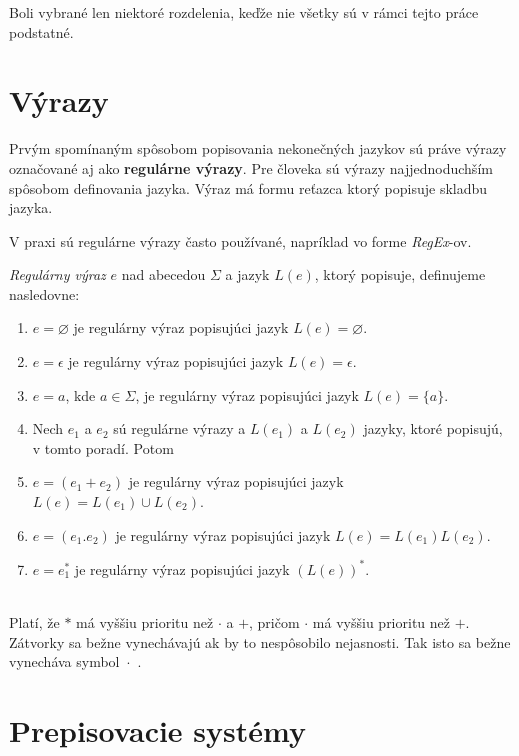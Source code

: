 Boli vybrané len niektoré rozdelenia, keďže nie všetky sú v rámci tejto práce podstatné.

\section{Výrazy}
\label{regularExpression}

Prvým spomínaným spôsobom popisovania nekonečných jazykov sú práve výrazy označované aj ako \textbf{regulárne výrazy}. Pre človeka sú výrazy najjednoduchším spôsobom definovania jazyka. Výraz má formu reťazca ktorý popisuje skladbu jazyka.

V praxi sú regulárne výrazy často používané, napríklad vo forme \textit{RegEx}-ov.

\begin{definition}
\textit{Regulárny výraz} $e$ nad abecedou $\Sigma$ a jazyk $L(e)$, ktorý popisuje, definujeme nasledovne:

\begin{enumerate}
    \itemsep0.2em 
    \item $e = \varnothing$ je regulárny výraz popisujúci jazyk $L(e) = \varnothing$.
    \item $e = \epsilon$ je regulárny výraz popisujúci jazyk $L(e) = \epsilon$.
    \item $e = a$, kde $a \in \Sigma$, je regulárny výraz popisujúci jazyk $L(e) = \{a\}$.
    \item[] Nech $e_1$ a $e_2$ sú regulárne výrazy a $L(e_1)$ a $L(e_2)$ jazyky, ktoré popisujú, v tomto poradí. Potom
    \item $e = (e_1 + e_2)$ je regulárny výraz popisujúci jazyk $L(e) = L(e_1) \cup L(e_2)$.
    \item $e = (e_1 . e_2)$ je regulárny výraz popisujúci jazyk $L(e) = L(e_1)L(e_2)$.
    \item $e = e_{1}^*$ je regulárny výraz popisujúci jazyk $(L(e))^*$.
\end{enumerate}
\end{definition}
\hfill\\

Platí, že $*$ má vyššiu prioritu než $\cdot$ a $+$, pričom $\cdot$ má vyššiu prioritu než $+$. Zátvorky sa bežne vynechávajú ak by to nespôsobilo nejasnosti. Tak isto sa bežne vynecháva symbol~$\cdot$~\cite{handbook}.

\section{Prepisovacie systémy}
\label{rewrite}

